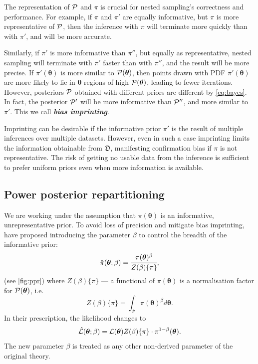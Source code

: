 \documentclass[usenatbib]{mnras}
\begin{document}
The representation of ${\cal P}$ and $\pi$ is crucial for nested
sampling's correctness and performance. For example, if $\pi$ and
$\pi'$ are equally informative, but $\pi$ is more representative of
${\cal P}$, then the inference with $\pi$ will terminate more quickly
than with $\pi'$, and will be more accurate.

Similarly, if $\pi'$ is more informative than $\pi''$, but equally as
representative, nested sampling will terminate with $\pi'$ faster than
with $\pi''$, and the result will be more precise. If
\(\pi' (\bm{\theta})\) is more similar to \( {\cal P} (\bm{\theta})\),
then points drawn with PDF \(\pi' (\bm{\theta})\) are more likely to
lie in $\bm{\theta}$ regions of high \( {\cal P} (\bm{\theta})\),
leading to fewer iterations. However, posteriors ${\cal P}$ obtained
with different priors are different by \cref{eq:bayes}. In fact, the
posterior ${\cal P}'$ will be more informative than ${\cal P}''$, and
more similar to $\pi'$. This we call \textbf{\emph{bias imprinting}}.


Imprinting can be desirable if the informative prior $\pi'$ is the
result of multiple inferences over multiple datasets. However, even in
such a case imprinting limits the information obtainable from
\(\mathfrak{D}\), manifesting confirmation bias if $\pi$ is not
representative. The risk of getting no usable data from the inference
is sufficient to prefer uniform priors even when more information is
available.
\subsection{Power posterior repartitioning}\label{sec:autopr}
We are working under the assumption that $\pi(\bm{\theta})$ is an
informative, unrepresentative prior. To avoid loss of precision and
mitigate bias imprinting, \cite{chen-ferroz-hobson} have proposed
introducing the parameter \(\beta\) to control the breadth of the
informative prior:
\begin{equation}
  \label{eq:autopr-prior}
  \hat{\pi}(\bm{\bm{\theta}};\beta) = \cfrac{\pi(\bm{\theta})^{\beta}}{Z(\beta)\{\pi\}},
\end{equation}
(see \cref{fig:ppr}) where \(Z(\beta)\{\pi\}\) --- a functional of
\(\pi (\bm{\theta})\) is a normalisation factor for
\( {\cal P} (\bm{\theta})\), i.e.
\begin{equation}
  Z(\beta)\{\pi\} = \int_{\Psi} \pi(\bm{\bm{\theta}})^{\beta}d\bm{\bm{\theta}}.
\end{equation}
In their prescription, the likelihood changes to
\begin{equation}
  \hat{\cal L}(\bm{\theta}; \beta) = {\cal L}(\bm{\theta}) Z(\beta)\{\pi\} \cdot \pi^{1-\beta}(\bm{\theta}).
\end{equation}
The new parameter $\beta$ is treated as any other non-derived
parameter of the original theory.
\end{document}
